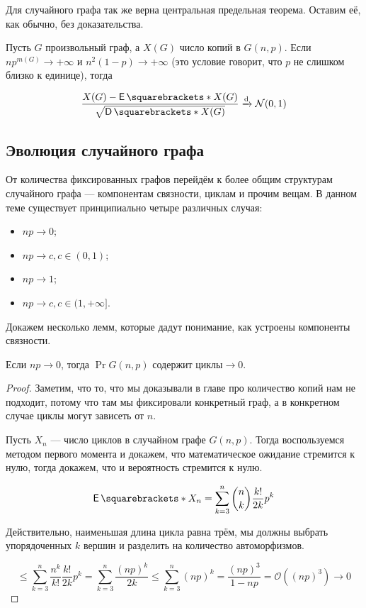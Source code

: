 Для случайного графа так же верна центральная предельная теорема. Оставим её,
как обычно, без доказательства.

\begin{theorem}
  Пусть $G$ произвольный граф, а $X(G)$ число копий в $G(n, p)$. Если 
  $np^{m(G)}\to +\infty$ и $n^2(1 - p) \to +\infty$ (это условие говорит, что
  $p$ не слишком близко к единице), тогда

  \[
    \frac{X(G) - \E{X(G)}}{\sqrt{\D{X(G)}}} \dto \mathcal{N}(0, 1)
  \]
\end{theorem}

\subsection{Эволюция случайного графа}

От количества фиксированных графов перейдём к более общим структурам случайного
графа --- компонентам связности, циклам и прочим вещам. В данном теме существует
принципиально четыре различных случая:

\begin{itemize}
  \item $np \to 0$;
  \item $np \to c, c \in (0, 1)$;
  \item $np \to 1$;
  \item $np \to c, c \in (1, +\infty]$.
\end{itemize}

Докажем несколько лемм, которые дадут понимание, как устроены компоненты связности.

\begin{lemma}
  Если $np \to 0$, тогда $\Pr{G(n, p) \text{ содержит циклы}} \to 0$.
\end{lemma}

\begin{proof}
  Заметим, что то, что мы доказывали в главе про количество копий нам не подходит,
  потому что там мы фиксировали конкретный граф, а в конкретном случае циклы могут зависеть
  от $n$.

  Пусть $X_n$ --- число циклов в случайном графе $G(n, p)$. Тогда воспользуемся
  методом первого момента и докажем, что математическое ожидание стремится к нулю,
  тогда докажем, что и вероятность стремится к нулю.

  \[
    \E{X_n} = \sum\limits_{k = 3}^n \binom{n}{k}\frac{k!}{2k}p^k
  \]

  Действительно, наименьшая длина цикла равна трём, мы должны выбрать упорядоченных
  $k$ вершин и разделить на количество автоморфизмов.

  \[
     \leq \sum\limits_{k = 3}^n \frac{n^k}{k!}\frac{k!}{2k}p^k = 
     \sum\limits_{k = 3}^n \frac{(np)^k}{2k} \leq \sum\limits_{k = 3}^n (np)^k
     = \frac{(np)^3}{1 - np} = \mathcal{O}((np)^3) \to 0
  \]
\end{proof}

